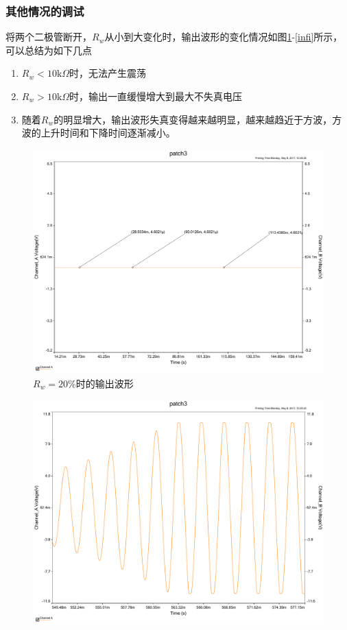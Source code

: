 \documentclass[UTF8,a4paper]{paper}
\begin{document}
\subsubsection{其他情况的调试}
将两个二极管断开，$R_w$从小到大变化时，输出波形的变化情况如图\ref{20}-\ref{infi}所示，可以总结为如下几点
\begin{enumerate}
\item $R_w < 10 \mathrm{k}\Omega$时，无法产生震荡
\item $R_w > 10 \mathrm{k}\Omega$时，输出一直缓慢增大到最大不失真电压
\item 随着$R_w$的明显增大，输出波形失真变得越来越明显，越来越趋近于方波，方波的上升时间和下降时间逐渐减小。
\end{enumerate}
\begin{multicols}{2}
\begin{figure}[H]
\centering
\includegraphics[width=\columnwidth]{0ac.pdf}
\caption{$R_w=20\%$时的输出波形}
\label{20}
\end{figure}
\begin{figure}[H]
\centering
\includegraphics[width=\columnwidth]{21ac.pdf}

\end{figure}
\end{multicols}
\end{document}
